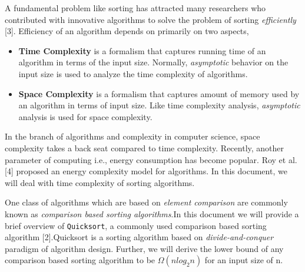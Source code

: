 \documentclass[a4paper, 10pt,twocolumn]{article}
\begin{document}
 A fundamental problem like sorting has attracted many researchers who contributed with innovative algorithms to solve the problem of sorting \textit{efficiently} [3]. Efficiency of an algorithm depends on primarily on two aspects,
\begin{itemize}
  \item \textbf{Time Complexity} is a formalism that captures running time of an algorithm in terms of the input size. Normally, \textit{asymptotic} behavior on the input size is used to analyze the time complexity of algorithms.
  \item \textbf{Space Complexity} is a formalism that captures amount of memory used by an algorithm in terms of input size. Like time complexity analysis, \textit{asymptotic} analysis is used for space complexity.
\end{itemize}
In the branch of algorithms and complexity in computer science, space complexity takes a back seat compared to time complexity. Recently, another parameter of computing i.e., energy consumption has become popular. Roy et al. [4] proposed an energy complexity model for algorithms. In this document, we will deal with time complexity of sorting algorithms.

One class of algorithms which are based on \textit{element comparison} are commonly known as \textit{comparison based sorting algorithms}.In this document we will provide a brief overview of \texttt{Quicksort}, a commonly used comparison based sorting algorithm [2].Quicksort is a sorting algorithm based on \textit{divide-and-conquer} paradigm of algorithm design. Further, we will derive the lower bound of any comparison based sorting algorithm to be $\Omega(nlog_2{n})$ for an input size of n.
\end{document}
